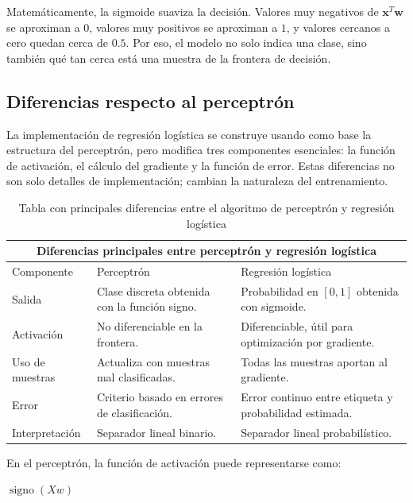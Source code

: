 \documentclass[12pt]{article}
\begin{document}
Matemáticamente, la sigmoide suaviza la decisión. Valores muy negativos de $\mathbf{x}^{T}\mathbf{w}$ se aproximan a $0$, valores muy positivos se aproximan a $1$, y valores cercanos a cero quedan cerca de $0.5$. Por eso, el modelo no solo indica una clase, sino también qué tan cerca está una muestra de la frontera de decisión.

\subsection{Diferencias respecto al perceptrón}

La implementación de regresión logística se construye usando como base la estructura del perceptrón, pero modifica tres componentes esenciales: la función de activación, el cálculo del gradiente y la función de error. Estas diferencias no son solo detalles de implementación; cambian la naturaleza del entrenamiento.

\begin{table}[H]
  \centering
  \begin{tabular}{p{}p{}p{}}
    \multicolumn{3}{c}{Diferencias principales entre perceptrón y regresión logística} \\
    \toprule
    Componente & Perceptrón & Regresión logística \\
    \midrule
    Salida & Clase discreta obtenida con la función signo. & Probabilidad en $[0,1]$ obtenida con sigmoide. \\
    Activación & No diferenciable en la frontera. & Diferenciable, útil para optimización por gradiente. \\
    Uso de muestras & Actualiza con muestras mal clasificadas. & Todas las muestras aportan al gradiente. \\
    Error & Criterio basado en errores de clasificación. & Error continuo entre etiqueta y probabilidad estimada. \\
    Interpretación & Separador lineal binario. & Separador lineal probabilístico. \\
    \bottomrule
  \end{tabular}
  \caption{Tabla con principales diferencias entre el algoritmo de perceptrón y regresión logística}
\end{table}

En el perceptrón, la función de activación puede representarse como:

\begin{algorithm}[H]
\caption{Activación del perceptrón}
\begin{algorithmic}[1]
    \State \Return $\operatorname{signo}(Xw)$
\EndFunction
\end{algorithmic}
\end{algorithm}
\end{document}
